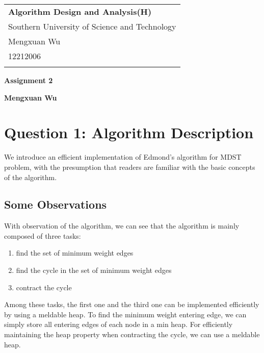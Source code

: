 \documentclass[a4paper,12pt]{article}
\begin{document}
\thispagestyle{empty} %

\begin{tabular}{p{15.5cm}}
{\large \bf Algorithm Design and Analysis(H)} \\
Southern University of Science and Technology \\ Mengxuan Wu \\ 12212006 \\
\hline
\\
\end{tabular}

\vspace*{0.3cm} %

\begin{center}
	{\Large \bf Assignment 2}
	\vspace{2mm}

	{\bf Mengxuan Wu}
		
\end{center}  

\vspace*{0.4cm}

\section*{Question 1: Algorithm Description}

We introduce an efficient implementation of Edmond's algorithm for MDST problem, with the presumption that readers are familiar with the basic concepts of the algorithm.

\subsection*{Some Observations}

With observation of the algorithm, we can see that the algorithm is mainly composed of three tasks:
\begin{enumerate}
	\item find the set of minimum weight edges
	\item find the cycle in the set of minimum weight edges
	\item contract the cycle
\end{enumerate}

Among these tasks, the first one and the third one can be implemented efficiently by using a meldable heap. 
To find the minimum weight entering edge, we can simply store all entering edges of each node in a min heap.
For efficiently maintaining the heap property when contracting the cycle, we can use a meldable heap.
\end{document}
